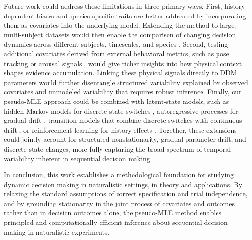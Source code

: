 \documentclass[00-main.tex]{subfiles}
\begin{document}
Future work could address these limitations in three primary ways. First, history-dependent biases and species-specific traits \citep{nguyen_different_2022, shevinsky_interaction_2019, li_dynamic_2024, pagan_individual_2025} are better addressed by incorporating them as covariates into the underlying model. Extending the method to large, multi-subject datasets would then enable the comparison of changing decision dynamics across different subjects, timescales, and species \citep{asadpour_rodents_2024, danskin_exponential_2023, nguyen_different_2022}. Second, testing additional covariates derived from external behavioral metrics, such as pose tracking \citep{mathis_deeplabcut_2018} or arousal signals \citep{murphy_pupil-linked_2014}, would give richer insights into how physical context shapes evidence accumulation. Linking these physical signals directly to DDM parameters would further disentangle structured variability explained by observed covariates and unmodeled variability that requires robust inference. Finally, our pseudo-MLE approach could be combined with latent-state models, such as hidden Markov models for discrete state switches \citep{ashwood_mice_2022, mohammadi_identifying_2025, kucharsky_hidden_2021, senne_state-dependent_2025}, autoregressive processes for gradual drift \citep{urai_choice_2019, vloeberghs_bayesian_2025}, transition models that combine discrete switches with continuous drift \citep{schumacher_neural_2023, schumacher_validation_2025}, or reinforcement learning for history effects \citep{pedersen_drift_2017, fontanesi_reinforcement_2019, fengler_beyond_2022}. Together, these extensions could jointly account for structured nonstationarity, gradual parameter drift, and discrete state changes, more fully capturing the broad spectrum of temporal variability inherent in sequential decision making.

In conclusion, this work establishes a methodological foundation for studying dynamic decision making in naturalistic settings, in theory and applications. By relaxing the standard assumptions of correct specification and trial independence, and by grounding stationarity in the joint process of covariates and outcomes rather than in decision outcomes alone, the pseudo-MLE method enables principled and computationally efficient inference about sequential decision making in naturalistic experiments.
\end{document}
